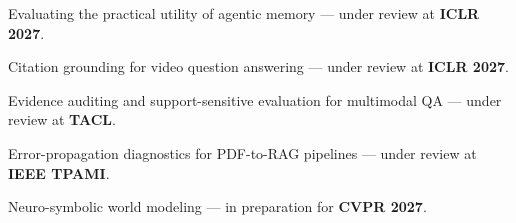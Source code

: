 \documentclass[11pt, a4paper]{awesome-cv}
\newenvironment{cvbullets}{%
  \vspace{2mm}
  \paragraphstyle
  \begin{cvitems}
}{%
  \end{cvitems}
  \vspace{3mm}
}
\begin{document}
\begin{cvbullets}
  \item {Evaluating the practical utility of agentic memory --- under review at \textbf{ICLR 2027}.}
  \item {Citation grounding for video question answering --- under review at \textbf{ICLR 2027}.}
  \item {Evidence auditing and support-sensitive evaluation for multimodal QA --- under review at \textbf{TACL}.}
  \item {Error-propagation diagnostics for PDF-to-RAG pipelines --- under review at \textbf{IEEE TPAMI}.}
\end{cvbullets}

\begin{cvbullets}
  \item {Neuro-symbolic world modeling --- in preparation for \textbf{CVPR 2027}.}
\end{cvbullets}
\end{document}
